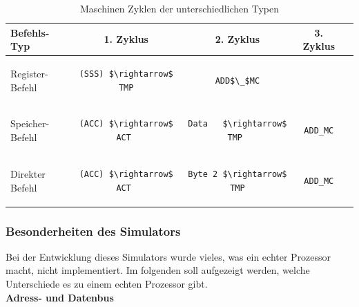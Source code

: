 \documentclass[12pt]{article}
\newcommand{\imgSpaceBefore}{\vspace{10pt}}
\begin{document}
\imgSpaceBefore
\begin{table}[H]
\centering
\begin{tabular}{|l|c|c|c|c| } 
 \hline
 Befehls-Typ & 1. Zyklus & 2. Zyklus & 3. Zyklus \\
 \hline 
 Register-Befehl
 &
 \begin{lstlisting}
(SSS) $\rightarrow$ TMP
 \end{lstlisting}
 &
 \begin{lstlisting}
ADD$\_$MC
 \end{lstlisting}
 & \\
 
 Speicher-Befehl & 
 \begin{lstlisting}
(ACC) $\rightarrow$ ACT 
 \end{lstlisting}  
  & 
 \begin{lstlisting}
Data   $\rightarrow$ TMP 
 \end{lstlisting} 
 & 
 \begin{lstlisting}
ADD_MC
 \end{lstlisting} 
 \\ 
 
 Direkter Befehl & 
 \begin{lstlisting}
(ACC) $\rightarrow$ ACT 
 \end{lstlisting} 
 & 
 \begin{lstlisting}
Byte 2 $\rightarrow$ TMP
 \end{lstlisting} 
 &
  \begin{lstlisting}
ADD_MC
 \end{lstlisting}
 \\
 
 \hline
\end{tabular}
\caption{Maschinen Zyklen der unterschiedlichen Typen}
\label{table:mc_types}
\end{table}


\subsubsection{Besonderheiten des Simulators}
Bei der Entwicklung dieses Simulators wurde vieles, was ein echter Prozessor macht, nicht implementiert. Im folgenden soll aufgezeigt werden, welche Unterschiede es zu einem echten Prozessor gibt.
\\

\noindent
\textbf{Adress- und Datenbus}
\end{document}

